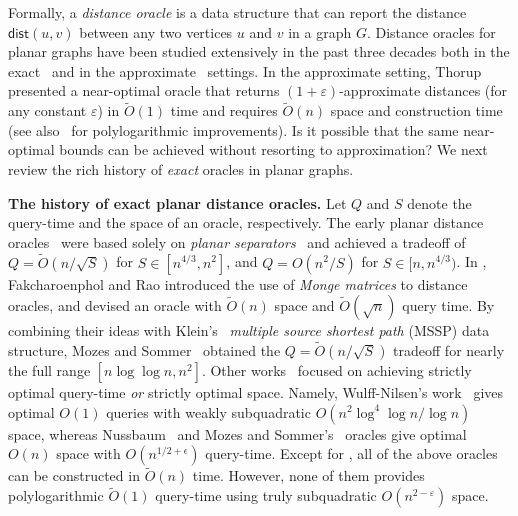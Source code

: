 \documentclass{article}
\newcommand{\dist}{\mathsf{dist}}
\newcommand{\Otild}{\tilde{O}}
\begin{document}
Formally, a \emph{distance oracle} is a data structure that can report the distance $\dist(u,v)$ between any two vertices $u$ and $v$ in a graph $G$.
Distance oracles for planar graphs have been studied extensively in the past three decades both in the exact~\cite{LongPettie,ourJACM,Fredslund-HMW-N20,ArikatiCCDSZ96,Djidjev96,ChenX00,FakcharoenpholR06,Klein05,Wulff-Nilsen10,Nussbaum11,Cabello12,MozesS2012,Cohen-AddadDW17,GawrychowskiMWW18,CharalampopoulosGMW19} and in the approximate~\cite{Thorup04,KawarabayashiKS11,KawarabayashiST13,Klein02,GuX19,Wulff-Nilsen16,ChanS19,LeW21} settings.
In the approximate setting, Thorup~\cite{Thorup04} presented a near-optimal oracle that returns
 $(1+\varepsilon)$-approximate distances (for any constant $\varepsilon$) in $\tilde O(1)$ time and requires $\tilde O(n)$ space and construction time (see also~\cite{Klein02,KawarabayashiKS11,KawarabayashiST13,GuX19,Wulff-Nilsen16,ChanS19,LeW21} for polylogarithmic improvements). Is it possible that the same near-optimal bounds can be achieved without resorting to approximation? We next review the rich history of {\em exact} oracles in planar graphs.

\medskip
\noindent
{\bf The history of exact planar distance oracles.}
Let $Q$ and $S$ denote the query-time and the space of an oracle, respectively.
The early planar distance oracles~\cite{ArikatiCCDSZ96,Djidjev96,ChenX00} were based solely on {\em planar separators}~\cite{LiptonT80,Miller86,Frederickson87} and achieved a tradeoff of
$Q=\tilde{O}(n/\sqrt{S})$ for $S\in [n^{4/3},n^2]$, and
$Q=O(n^2/S)$ for $S \in [n,n^{4/3})$.
In \cite{FakcharoenpholR06},  Fakcharoenphol and Rao introduced the use of \emph{Monge matrices} to distance oracles, and devised an oracle with $\tilde{O}(n)$ space and $\tilde{O}(\sqrt{n})$ query time.
By combining their ideas with Klein's~\cite{Klein02,CabelloCE13} {\em multiple source shortest path} (MSSP) data structure, Mozes and Sommer~\cite{MozesS2012} obtained the $Q=\tilde{O}(n/\sqrt{S})$ tradeoff for nearly the full range $[n\log\log n, n^2]$.
Other works~\cite{Wulff-Nilsen10,Nussbaum11,MozesS2012,Fredslund-HMW-N20} focused on achieving strictly optimal query-time {\em or} strictly optimal space.
Namely, Wulff-Nilsen's work~\cite{Wulff-Nilsen10} gives optimal $O(1)$ queries with weakly subquadratic $O(n^2\log^4\log n/\log n)$ space, whereas Nussbaum~\cite{Nussbaum11} and Mozes and Sommer's~\cite{MozesS2012} oracles give optimal $O(n)$ space with $O(n^{1/2+\epsilon})$ query-time.
Except for \cite{Wulff-Nilsen10}, all of the above oracles can be  constructed in $\Otild(n)$ time.
However, none of them provides polylogarithmic $\tilde O(1)$ query-time using truly subquadratic $O(n^{2-\varepsilon})$ space.
\end{document}
